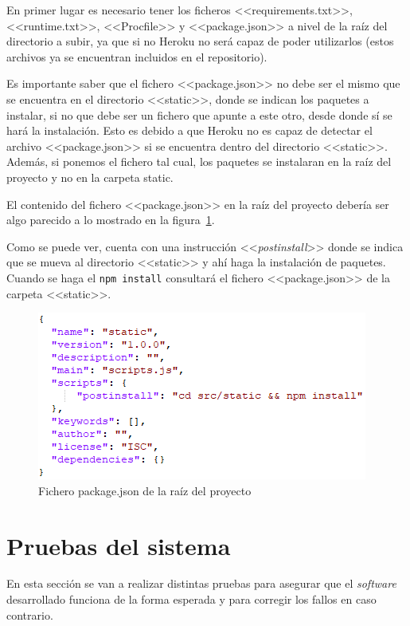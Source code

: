 En primer lugar es necesario tener los ficheros <<requirements.txt>>, <<runtime.txt>>, <<Procfile>> y <<package.json>> a nivel de la raíz del directorio a subir, ya que si no Heroku no será capaz de poder utilizarlos (estos archivos ya se encuentran incluidos en el repositorio).

Es importante saber que el fichero <<package.json>> no debe ser el mismo que se encuentra en el directorio <<static>>, donde se indican los paquetes a instalar, si no que debe ser un fichero que apunte a este otro, desde donde sí se hará la instalación. 
Esto es debido a que Heroku no es capaz de detectar el archivo <<package.json>> si se encuentra dentro del directorio <<static>>. Además, si ponemos el fichero tal cual, los paquetes se instalaran en la raíz del proyecto y no en la carpeta static.

El contenido del fichero <<package.json>> en la raíz del proyecto debería ser algo parecido a lo mostrado en la figura~\ref{fig:ficheroPackage}.

Como se puede ver, cuenta con una instrucción <<\textit{postinstall}>> donde se indica que se mueva al directorio <<static>> y ahí haga la instalación de paquetes.
Cuando se haga el \texttt{npm install} consultará el fichero <<package.json>> de la carpeta <<static>>.

\begin{figure}
	\centering
	\includegraphics[width=.8\textwidth]{../img/Anexos/ManualProgramador/package.png}
	\caption{Fichero package.json de la raíz del proyecto}\label{fig:ficheroPackage}
\end{figure}


\section{Pruebas del sistema}
En esta sección se van a realizar distintas pruebas para asegurar que el \textit{software} desarrollado funciona de la forma esperada y para corregir los fallos en caso contrario.

